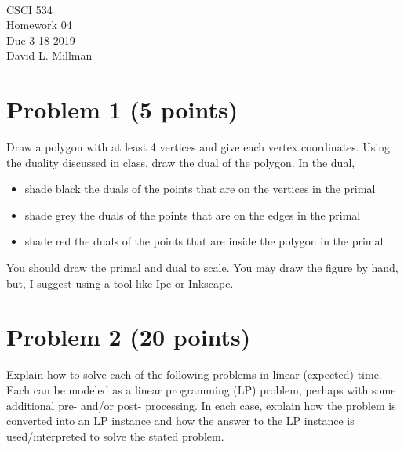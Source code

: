 \documentclass[11pt]{article}
\newcommand{\course}{CSCI 534}
\newcommand{\proj}{Homework 04}
\newcommand{\dueDate}{3-18-2019}
\newcommand{\instructor}{David L. Millman}
\begin{document}
{ ~\\
    \course \\ 
    \proj \\ 
    Due \dueDate \\
    \instructor
}

\section*{Problem 1 (5 points)}

Draw a polygon with at least 4 vertices and give each vertex coordinates.
Using the duality discussed in class, draw the dual of the polygon.  In the
dual,
\begin{itemize}
    \item shade black the duals of the points that are on the vertices in the primal
    \item shade grey the duals of the points that are on the edges in the primal
    \item shade red the duals of the points that are inside the polygon in the primal
\end{itemize}

You should draw the primal and dual to scale.  You may draw the figure by hand,
but, I suggest using a tool like Ipe or Inkscape.

\section*{Problem 2 (20 points)}

Explain how to solve each of the following problems in linear (expected) time.
Each can be modeled as a linear programming (LP) problem, perhaps with some
additional pre- and/or post- processing. In each case, explain how the problem
is converted into an LP instance and how the answer to the LP instance is
used/interpreted to solve the stated problem.
\end{document}
